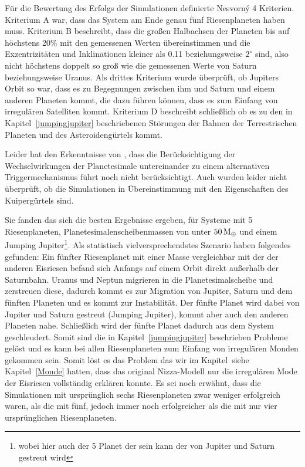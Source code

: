 \documentclass[12pt,a4paper,twoside,open=right,bibliography=totoc]{scrbook}
\renewcommand{\cite}{ \citep}
\newcommand{\refsec}[1]{siehe Kapitel~\ref{#1}}
\newcommand{\ME}{M_\oplus}
\begin{document}
Für die Bewertung des Erfolgs der Simulationen definierte Nesvorný 4 Kriterien. Kriterium A war, dass das System am Ende genau fünf Riesenplaneten haben muss. Kriterium B beschreibt, dass die großen Halbachsen der Planeten bis auf höchstens 20\% mit den gemessenen Werten übereinstimmen und die Exzentrizitäten und Inklinationen kleiner als 0.11 beziehungsweise $2^\circ$ sind, also nicht höchstens doppelt so groß wie die gemessenen Werte von Saturn beziehungsweise Uranus.
Als drittes Kriterium wurde überprüft, ob Jupiters Orbit so war, dass es zu Begegnungen zwischen ihm und Saturn und einem anderen Planeten kommt, die dazu führen können, dass es zum Einfang von irregulären Satelliten kommt.
Kriterium D beschreibt schließlich ob es zu den in Kapitel~\ref{jumpingjupiter} beschriebenen Störungen der Bahnen der Terrestrischen Planeten und des Asteroidengürtels kommt. %

Leider hat \cite{Nesvorny2012} den Erkenntnisse von \cite{Levison2011}, dass die Berücksichtigung der Wechselwirkungen der Planetesimale untereinander zu einem alternativen Triggermechanismus führt noch nicht berücksichtigt. Auch wurden leider nicht überprüft, ob die Simulationen in Übereinstimmung mit den Eigenschaften des Kuipergürtels sind.

Sie fanden das sich die besten Ergebnisse ergeben, für Systeme mit 5 Riesenplaneten, Planetesimalenscheibenmassen von unter $\unit[50]{\ME}$ und einem Jumping Jupiter\footnote{wobei hier auch der 5 Planet der sein kann der von Jupiter und Saturn gestreut wird}.
Als statistisch vielversprechendstes Szenario haben \cite{Nesvorny2012} folgendes gefunden:
Ein fünfter Riesenplanet mit einer Masse vergleichbar mit der der anderen Eisriesen befand sich Anfangs auf einem Orbit direkt außerhalb der Saturnbahn.
Uranus und Neptun migrieren in die Planetesimalscheibe und zerstreuen diese, dadurch kommt es zur Migration von Jupiter, Saturn und dem fünften Planeten und es kommt zur Instabilität. Der fünfte Planet wird dabei von Jupiter und Saturn gestreut (Jumping Jupiter), kommt aber auch den anderen Planeten nahe. Schließlich wird der fünfte Planet dadurch aus dem System geschleudert.
Somit sind die in Kapitel~\ref{jumpingjupiter} beschrieben Probleme gelöst und es kann bei allen Riesenplaneten zum Einfang von irregulären Monden gekommen sein. Somit löst es das Problem das wir im Kapitel~\refsec{Monde} hatten, dass das original Nizza-Modell nur die irregulären Mode der Eisriesen vollständig erklären konnte.
Es sei noch erwähnt, dass die Simulationen mit ursprünglich sechs Riesenplaneten zwar weniger erfolgreich waren, als die mit fünf, jedoch immer noch erfolgreicher als die mit nur vier ursprünglichen Riesenplaneten.
\end{document}
